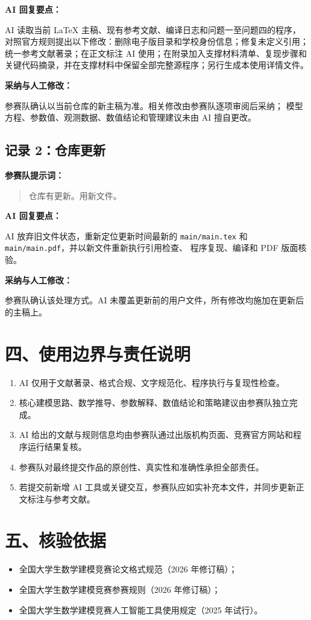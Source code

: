 \documentclass[11pt,a4paper]{ctexart}
\begin{document}
\textbf{AI 回复要点：}

AI 读取当前 LaTeX 主稿、现有参考文献、编译日志和问题一至问题四的程序，
对照官方规则提出以下修改：删除电子版目录和学校身份信息；修复未定义引用；
统一参考文献著录；在正文标注 AI 使用；在附录加入支撑材料清单、复现步骤和
关键代码摘录，并在支撑材料中保留全部完整源程序；另行生成本使用详情文件。

\textbf{采纳与人工修改：}

参赛队确认以当前仓库的新主稿为准。相关修改由参赛队逐项审阅后采纳；
模型方程、参数值、观测数据、数值结论和管理建议未由 AI 擅自更改。

\subsection*{记录 2：仓库更新}

\textbf{参赛队提示词：}

\begin{quote}
仓库有更新。用新文件。
\end{quote}

\textbf{AI 回复要点：}

AI 放弃旧文件状态，重新定位更新时间最新的
\texttt{main/main.tex} 和 \texttt{main/main.pdf}，并以新文件重新执行引用检查、
程序复现、编译和 PDF 版面核验。

\textbf{采纳与人工修改：}

参赛队确认该处理方式。AI 未覆盖更新前的用户文件，所有修改均施加在更新后的主稿上。

\section*{四、使用边界与责任说明}

\begin{enumerate}[leftmargin=2em]
  \item AI 仅用于文献著录、格式合规、文字规范化、程序执行与复现性检查。
  \item 核心建模思路、数学推导、参数解释、数值结论和策略建议由参赛队独立完成。
  \item AI 给出的文献与规则信息均由参赛队通过出版机构页面、竞赛官方网站和程序运行结果复核。
  \item 参赛队对最终提交作品的原创性、真实性和准确性承担全部责任。
  \item 若提交前新增 AI 工具或关键交互，参赛队应如实补充本文件，并同步更新正文标注与参考文献。
\end{enumerate}

\section*{五、核验依据}

\begin{itemize}[leftmargin=2em]
  \item 全国大学生数学建模竞赛论文格式规范（2026 年修订稿）；
  \item 全国大学生数学建模竞赛参赛规则（2026 年修订稿）；
  \item 全国大学生数学建模竞赛人工智能工具使用规定（2025 年试行）。
\end{itemize}
\end{document}
